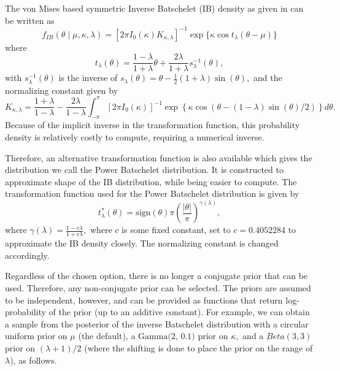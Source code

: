 \documentclass{article}
\begin{document}
The von Mises based symmetric Inverse Batschelet (IB) density as given
in \citet{jones2012inverse} can be written as
\begin{equation} \label{eqn:invbatpdf}
f_{IB}(\theta \mid \mu, \kappa, \lambda) = [2\pi I_0(\kappa)K_{\kappa, \lambda}]^{-1} \exp\{\kappa \cos t_\lambda(\theta - \mu)\}
\end{equation} where \begin{equation} \label{eqn:invbattransform}
t_\lambda(\theta) = \frac{1 - \lambda}{1 + \lambda}\theta + \frac{2\lambda}{1 + \lambda} s_\lambda^{-1}(\theta),
\end{equation} with \(s_\lambda^{-1}(\theta)\) is the inverse of
\(s_\lambda(\theta) = \theta - \frac{1}{2} (1 + \lambda) \sin(\theta),\)
and the normalizing constant given by \begin{equation}
K_{\kappa, \lambda} = \frac{1 + \lambda}{1 - \lambda} - \frac{2\lambda}{1 - \lambda} \int_{-\pi}^\pi [2\pi I_0(\kappa)]^{-1} \exp\left\{\kappa \cos \left(\theta -  (1 - \lambda) \sin(\theta) / 2 \right) \right\} d\theta.
\end{equation} Because of the implicit inverse in the transformation
function, this probability density is relatively costly to compute,
requiring a numerical inverse.

Therefore, an alternative transformation function is also available
which gives the distribution we call the Power Batschelet distribution.
It is constructed to approximate shape of the IB distribution, while
being easier to compute. The transformation function used for the Power
Batschelet distribution is given by \begin{equation}
t_{\lambda}^\ast(\theta) = \text{sign}(\theta)\pi \left( \frac{\vert\theta\vert}{\pi} \right)^{\gamma(\lambda)},
\end{equation} where
\(\gamma(\lambda) = \frac{1 - c\lambda}{1 + c\lambda},\) where \(c\) is
some fixed constant, set to \(c = 0.4052284\) to approximate the IB
density closely. The normalizing constant is changed accordingly.

Regardless of the chosen option, there is no longer a conjugate prior
that can be used. Therefore, any non-conjugate prior can be selected.
The priors are assumed to be independent, however, and can be provided
as functions that return log-probability of the prior (up to an additive
constant). For example, we can obtain a sample from the posterior of the
inverse Batschelet distribution with a circular uniform prior on \(\mu\)
(the default), a \(\text{Gamma(2, 0.1)}\) prior on \(\kappa,\) and a
\(Beta(3, 3)\) prior on \((\lambda + 1)/2\) (where the shifting is done
to place the prior on the range of \(\lambda\)), as follows.
\end{document}
